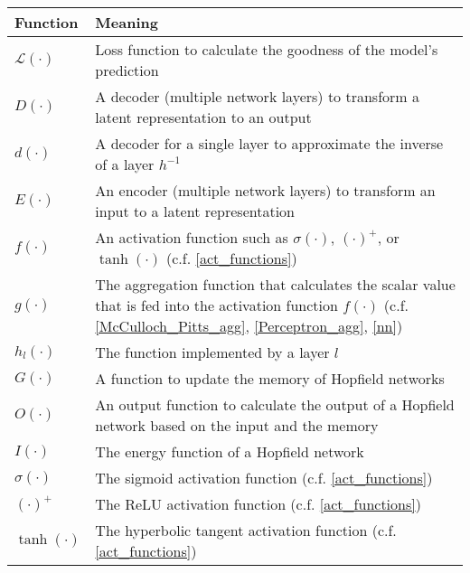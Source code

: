 \begin{tabular}{ p{3cm} p{11cm} }
	\textbf{Function} & \textbf{Meaning}\\
	\hline
	$\mathcal{L}(\cdot)$ & Loss function to calculate the goodness of the model's prediction\\
	$D(\cdot)$ & A decoder (multiple network layers) to transform a latent representation to an output\\
	$d(\cdot)$ & A decoder for a single layer to approximate the inverse of a layer $h^{-1}$\\
	$E(\cdot)$ & An encoder (multiple network layers) to transform an input to a latent representation\\
	$f(\cdot)$ & An activation function such as $\sigma(\cdot)$, $(\cdot)^{+}$, or $\tanh(\cdot)$ (c.f. \eqref{act_functions})\\
	$g(\cdot)$ & The aggregation function that calculates the scalar value that is fed into the activation function $f(\cdot)$ (c.f. \eqref{McCulloch_Pitts_agg}, \eqref{Perceptron_agg}, \eqref{nn})\\
	$h_l(\cdot)$ & The function implemented by a layer $l$\\
	$G(\cdot)$ & A function to update the memory of Hopfield networks\\
	$O(\cdot)$ & An output function to calculate the output of a Hopfield network based on the input and the memory\\
	$I(\cdot)$ & The energy function of a Hopfield network\\
	$\sigma(\cdot)$ & The sigmoid activation function (c.f. \eqref{act_functions})\\
	$(\cdot)^{+}$ & The ReLU activation function (c.f. \eqref{act_functions})\\
	 $\tanh(\cdot)$ & The hyperbolic tangent activation function (c.f. \eqref{act_functions})\\
	
\end{tabular}

